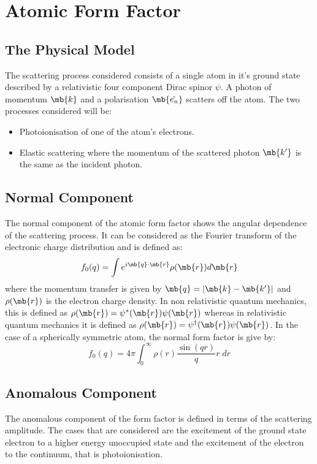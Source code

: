 \section{Atomic Form Factor}
    \subsection{The Physical Model}
    The scattering process considered consists of a single atom in it's
    ground state described by a relativistic four component Dirac spinor
    $\psi$. A photon of momentum $\mb{k}$ and a polarisation $\mb{\hat{e_n}}$
    scatters off the atom. The two processes considered will be:
    \begin{itemize}
        \item Photoionisation of one of the atom's electrons.
        \item Elastic scattering where the momentum of the scattered
              photon $\mb{k'}$ is the same as the incident photon.
    \end{itemize}

    \subsection{Normal Component}
    The normal component of the atomic form factor shows the angular
    dependence of the scattering process. It can be considered as the
    Fourier transform of the electronic charge distribution and is
    defined as:
    \begin{equation} \label{eq:nff-general}
        f_0(q) = \int e^{i \mb{q} \cdot \mb{r} } \rho(\mb{r}) d\mb{r}
    \end{equation}
    where the momentum transfer is given by $\mb{q} = |\mb{k} - \mb{k'}|$ 
    and $\rho(\mb{r})$ is the electron charge density. In non
    relativistic quantum mechanics, this is defined as 
    $\rho(\mb{r}) = \psi^{*}(\mb{r}) \psi(\mb{r})$ whereas in
    relativistic quantum mechanics it is defined as 
    $\rho(\mb{r}) = \psi^{\dagger}(\mb{r}) \psi(\mb{r})$.
    In the case of a spherically symmetric atom, the normal form factor
    is give by:
    \begin{equation} \label{eq:nff-spherical}
        f_0(q) = 4 \pi \int_{0}^{\infty} \rho(r) \frac{\sin (qr)}{q} r \; dr
    \end{equation}

    \subsection{Anomalous Component}
    The anomalous component of the form factor is defined in terms of
    the scattering amplitude. The cases that are considered are the
    excitement of the ground state electron to a higher energy
    unoccupied state and the excitement of the electron to the
    continuum, that is photoionisation.

